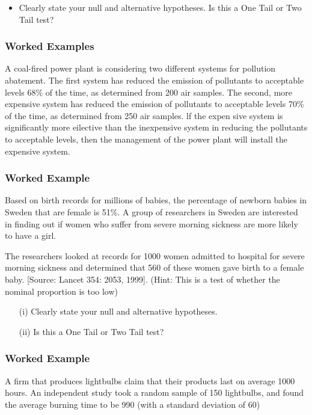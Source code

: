 \documentclass[]{report}
\begin{document}
{\begin{itemize}
	\item Clearly state your null and alternative hypotheses.
	Is this a One Tail or Two Tail test?
\end{itemize}	

\subsubsection{Worked Examples} 

A coal-fired power plant is considering two different systems for pollution abatement. The first system has reduced the emission of pollutants to acceptable levels 68\% of the time, as determined from 200 air samples. The second, more expensive system has reduced the emission of
pollutants to acceptable levels 70\% of the time, as determined from 250 air samples. lf the expen sive system is significantly more eilective than the inexpensive system in reducing the pollutants to acceptable levels, then the management of the power plant will install the expensive system.

\subsubsection{Worked Example}
Based on birth records for millions of babies, the percentage of newborn babies in Sweden that are female is 51\%. A group of researchers in Sweden are interested in finding out if women who suffer from severe morning
sickness are more likely to have a girl. 

The researchers looked at records for 1000 women admitted to hospital for
severe morning sickness and determined that 560 of these women gave birth
to a female baby.  [Source: Lancet 354: 2053, 1999].
(Hint: This is a test of whether the nominal proportion is too low)
\begin{itemize}
	\item[(i)] Clearly state your null and alternative hypotheses.
	\item[(ii)] Is this a One Tail or Two Tail test?
\end{itemize}

	\subsubsection{Worked Example}
	A firm that produces lightbulbs claim that their products last on average 1000 hours. An independent study took a random sample of 150 lightbulbs, and found the average burning time to be 990 (with a standard deviation of 60)
	
}
\end{document}
